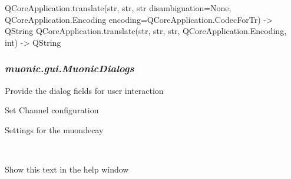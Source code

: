 \documentclass[letterpaper,10pt,english]{sphinxmanual}
\begin{document}
\begin{fulllineitems}
\label{muonic:muonic.gui.MuonicWidgets.tr}
QCoreApplication.translate(str, str, str disambiguation=None, QCoreApplication.Encoding encoding=QCoreApplication.CodecForTr) -\textgreater{} QString
QCoreApplication.translate(str, str, str, QCoreApplication.Encoding, int) -\textgreater{} QString

\end{fulllineitems}



\subsubsection{\emph{muonic.gui.MuonicDialogs}}
\label{muonic:module-muonic.gui.MuonicDialogs}\label{muonic:muonic-gui-muonicdialogs}
Provide the dialog fields for user interaction

\begin{fulllineitems}
\label{muonic:muonic.gui.MuonicDialogs.ConfigDialog}
Set Channel configuration

\end{fulllineitems}


\begin{fulllineitems}
\label{muonic:muonic.gui.MuonicDialogs.DecayConfigDialog}
Settings for the muondecay

\end{fulllineitems}


\begin{fulllineitems}
\label{muonic:muonic.gui.MuonicDialogs.HelpDialog}~

\begin{fulllineitems}
\label{muonic:muonic.gui.MuonicDialogs.HelpDialog.helptext}
Show this text in the help window

\end{fulllineitems}


\end{fulllineitems}
\end{document}
